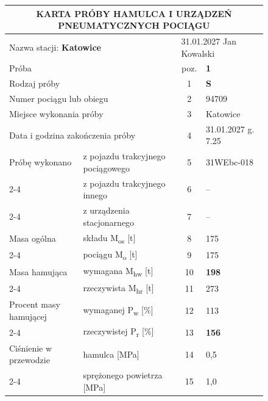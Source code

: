 \begin{figure}[p]
	\centering
	\footnotesize
	\renewcommand{\arraystretch}{1.12}
	\setlength{\tabcolsep}{3pt}
	\begin{tabular}{|l|l|c|>{\centering\arraybackslash}p{2.6cm}|}
		\hline
		\multicolumn{4}{|c|}{\textbf{KARTA PRÓBY HAMULCA I URZĄDZEŃ PNEUMATYCZNYCH POCIĄGU}} \\
		\hline
		\multicolumn{2}{|l|}{Nazwa stacji: \textbf{Katowice}} & \multicolumn{2}{l|}{31.01.2027 \quad Jan Kowalski} \\
		\hline
		\multicolumn{2}{|l|}{Próba} & poz. & \textbf{1} \\
		\hline
		\multicolumn{2}{|l|}{Rodzaj próby} & 1 & \cellcolor{green!15}\textbf{S} \\ \hline
		\multicolumn{2}{|l|}{Numer pociągu lub obiegu} & 2 & \cellcolor{green!15}94709 \\ \hline
		\multicolumn{2}{|l|}{Miejsce wykonania próby} & 3 & \cellcolor{green!15}Katowice \\ \hline
		\multicolumn{2}{|l|}{Data i godzina zakończenia próby} & 4 & \cellcolor{green!15}31.01.2027 g. 7.25 \\ \hline
		Próbę wykonano & z pojazdu trakcyjnego pociągowego & 5 & \cellcolor{green!15}31WEbc-018 \\ \cline{2-4}
		 & z pojazdu trakcyjnego innego & 6 & \cellcolor{green!15}– \\ \cline{2-4}
		 & z urządzenia stacjonarnego & 7 & \cellcolor{green!15}– \\ \hline
		Masa ogólna & składu M\textsubscript{os} [t] & 8 & \cellcolor{green!15}175 \\ \cline{2-4}
		 & pociągu M\textsubscript{o} [t] & 9 & \cellcolor{green!15}175 \\ \hline
		Masa hamująca & wymagana M\textsubscript{hw} [t] & 10 & \cellcolor{orange!25}\textbf{198} \\ \cline{2-4}
		 & rzeczywista M\textsubscript{hr} [t] & 11 & \cellcolor{green!15}273 \\ \hline
		Procent masy hamującej & wymaganej P\textsubscript{w} [\%] & 12 & \cellcolor{green!15}113 \\ \cline{2-4}
		 & rzeczywistej P\textsubscript{r} [\%] & 13 & \cellcolor{orange!25}\textbf{156} \\ \hline
		Ciśnienie w przewodzie & hamulca [MPa] & 14 & \cellcolor{green!15}0,5 \\ \cline{2-4}
		 & sprężonego powietrza [MPa] & 15 & \cellcolor{green!15}1,0 \\ \hline

\end{tabular}
\end{figure}
